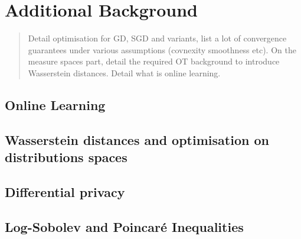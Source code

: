 \chapter[Additional Background]{Additional Background}
\label{chap:optim}
\addchapterlof
\addchapterloe
\addchapterloa

\minitoc

\begin{abstract}
    Detail optimisation for GD, SGD and variants, list a lot of convergence guarantees under various assumptions (covnexity smoothness etc). On the measure spaces part, detail the required OT background to introduce Wasserstein distances. Detail what is online learning.
\end{abstract}

\newpage

\section{Online Learning}

\section{Wasserstein distances and optimisation on distributions spaces}

\section{Differential privacy}

\section{Log-Sobolev and Poincaré Inequalities}


